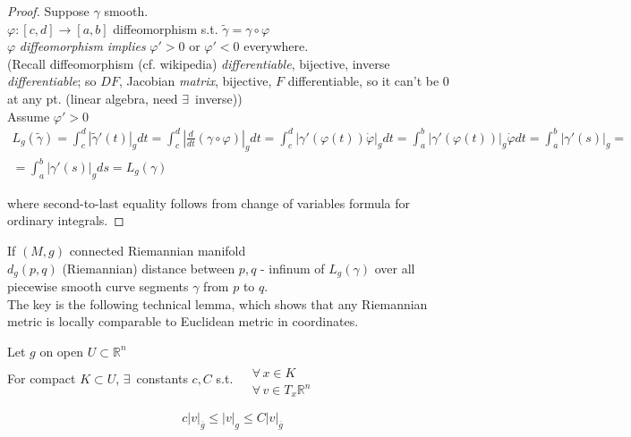 \begin{proof}
  Suppose $\gamma$ smooth. \\
\phantom{Suppose} $\varphi : [c,d] \to [a,b]$ diffeomorphism s.t. $\widetilde{\gamma} = \gamma \circ \varphi$ \\
$\varphi$ \emph{diffeomorphism} \emph{implies} $\varphi' >0$ or $\varphi' <0$ everywhere.   \\

(Recall diffeomorphism (cf. wikipedia) \emph{differentiable}, bijective, inverse \emph{differentiable}; so $DF$, Jacobian \emph{matrix}, bijective, 
$F$ differentiable, so it can't be $0$ at any pt. (linear algebra, need $\exists \, $ inverse)) \\

Assume $\varphi' >0$
\[
\begin{gathered}
  L_g(\widetilde{\gamma}) = \int_c^d |\widetilde{\gamma}'(t) |_g dt = \int_c^d \left| \frac{d}{dt} (\gamma \circ \varphi ) \right|_g  dt = \int_c^d | \gamma'(\varphi(t)) \dot{\varphi} |_g dt = \int_a^b |\gamma'(\varphi(t)) |_g \dot{\varphi} dt = \int_a^b |\gamma'(s)|_g = \\
  = \int_a^b |\gamma'(s)|_g ds = L_g(\gamma)
\end{gathered}
\]

where second-to-last equality follows from change of variables formula for ordinary integrals.




\end{proof}


If $(M,g)$ connected Riemannian manifold \\
$d_g(p,q)$ (Riemannian) distance between $p,q$ - infinum of $L_g(\gamma)$ over all piecewise smooth curve segments $\gamma$ from $p$ to $q$.   \\

The key is the following technical lemma, which shows that any Riemannian metric is locally comparable to Euclidean metric in coordinates.

\begin{lemma}[13.28] Let $g$ on open $U\subset \mathbb{R}^n$ \\
For compact $K \subset U$, $\exists \, $ constants $c,C$ s.t. $\begin{aligned} & \quad \\
  & \forall \, x \in K \\
  & \forall \, v\in T_x\mathbb{R}^n \end{aligned}$

\[
c|v|_{\overline{g}} \leq |v|_g \leq C |v|_{\overline{g}}
\]

\end{lemma}










